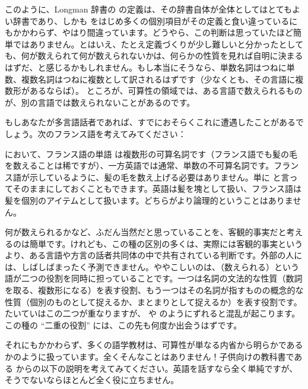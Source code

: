 このように、Longman 辞書の  の定義は、その辞書自体が全体としてはとてもよい辞書であり、しかも  をはじめ多くの個別項目がその定義と食い違っているにもかかわらず、やはり間違っています。どうやら、この判断は思っていたほど簡単ではありません。とはいえ、たとえ定義づくりが少し難しいと分かったとしても、何が数えられて何が数えられないかは、何らかの性質を見れば自明に決まるはずだ、と感じるかもしれません。もし本当にそうなら、単数名詞はつねに単数、複数名詞はつねに複数として訳されるはずです（少なくとも、その言語に複数形があるならば）。 ところが、可算性の領域では、ある言語で数えられるものが、別の言語では数えられないことがあるのです。

もしあなたが多言語話者であれば、すでにおそらくこれに遭遇したことがあるでしょう。次のフランス語を考えてみてください：

\label{ex:cheveaux}
\z
{} において、フランス語の単語  は複数形の可算名詞です（フランス語でも髪の毛を数えることは稀ですが）、一方英語では通常、単数の不可算名詞です。フランス語が示しているように、髪の毛を数え上げる必要はありません。単に  と言ってそのままにしておくこともできます。英語は髪を塊として扱い、フランス語は髪を個別のアイテムとして扱います。どちらがより論理的ということはありません。

何が数えられるかなど、ふだん当然だと思っていることを、客観的事実だと考えるのは簡単です。けれども、この種の区別の多くは、実際には客観的事実というより、ある言語や方言の話者共同体の中で共有されている判断です。外部の人には、しばしばまったく予測できません。ややこしいのは、（数えられる）という語が二つの役割を同時に担っていることです。一つは名詞の文法的な性質（数詞を取る、複数形になる）を表す役割、もう一つはその名詞が指すものの概念的な性質（個別のものとして捉えるか、まとまりとして捉えるか）を表す役割です。たいていはこの二つが重なりますが、 や  のようにずれると混乱が起こります。この種の \enquote{二重の役割} には、この先も何度か出会うはずです。

それにもかかわらず、多くの語学教材は、可算性が単なる内省から明らかであるかのように扱っています。全くそんなことはありません！子供向けの教科書である \citet{allen2008} からの以下の説明を考えてみてください。英語を話すなら全く単純ですが、そうでないならほとんど全く役に立ちません。

